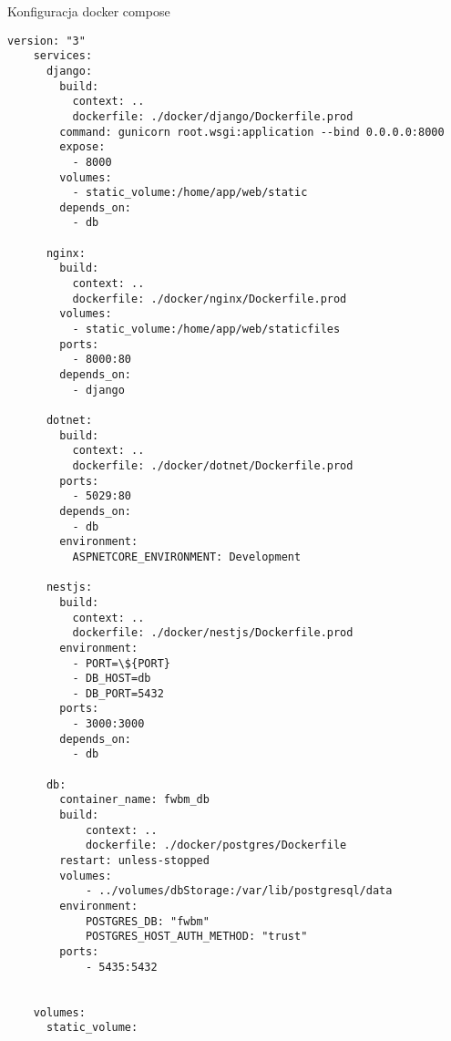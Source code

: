 \begin{easyappendix}{Konfiguracja docker compose}
    \begin{lstlisting}[frame=single]  % Start your code-block
    version: "3"
    services:
      django:
        build:
          context: ..
          dockerfile: ./docker/django/Dockerfile.prod
        command: gunicorn root.wsgi:application --bind 0.0.0.0:8000
        expose:
          - 8000
        volumes:
          - static_volume:/home/app/web/static
        depends_on:
          - db
    
      nginx:
        build:
          context: ..
          dockerfile: ./docker/nginx/Dockerfile.prod
        volumes:
          - static_volume:/home/app/web/staticfiles
        ports:
          - 8000:80
        depends_on:
          - django
    
      dotnet:
        build:
          context: ..
          dockerfile: ./docker/dotnet/Dockerfile.prod
        ports:
          - 5029:80
        depends_on:
          - db
        environment:
          ASPNETCORE_ENVIRONMENT: Development
      
      nestjs:
        build:
          context: ..
          dockerfile: ./docker/nestjs/Dockerfile.prod
        environment:
          - PORT=\${PORT}
          - DB_HOST=db
          - DB_PORT=5432
        ports:
          - 3000:3000
        depends_on:
          - db
    
      db:
        container_name: fwbm_db
        build:
            context: ..
            dockerfile: ./docker/postgres/Dockerfile
        restart: unless-stopped
        volumes:
            - ../volumes/dbStorage:/var/lib/postgresql/data
        environment:
            POSTGRES_DB: "fwbm"
            POSTGRES_HOST_AUTH_METHOD: "trust"
        ports:
            - 5435:5432
      
    
    volumes:
      static_volume:
    \end{lstlisting}
\end{easyappendix}
